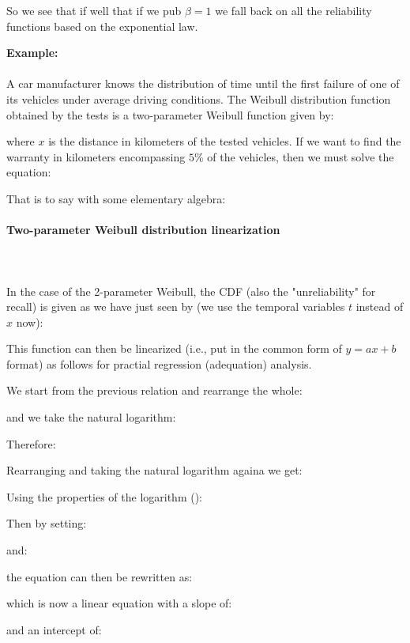	So we see that if well that if we pub $\beta=1$ we fall back on all the reliability functions based on the exponential law.
	\begin{tcolorbox}[colframe=black,colback=white,sharp corners]
	\textbf{{\Large {}}Example:}\\\\
	A car manufacturer knows the distribution of time until the first failure of one of its vehicles under average driving conditions. The Weibull distribution function obtained by the tests is a two-parameter Weibull function given by:
	
	where $x$ is the distance in kilometers of the tested vehicles.	
	If we want to find the warranty in kilometers encompassing $5\%$ of the vehicles, then we must solve the equation:
	
	That is to say with some elementary algebra:
	
	\end{tcolorbox}
	
	\paragraph{Two-parameter Weibull distribution linearization}\mbox{}\\\\
	In the case of the 2-parameter Weibull, the CDF (also the "unreliability" for recall) is given as we have just seen by (we use the temporal variables $t$ instead of $x$ now):
	
 	This function can then be linearized (i.e., put in the common form of $y=ax+b$ format) as follows for practial regression (adequation) analysis.
 	
 	We start from the previous relation and rearrange the whole:
	
 	and we take the natural logarithm:
	
 	Therefore:
	
	Rearranging and taking the natural logarithm againa we get:
	
	Using the properties of the logarithm ():
	
	Then by setting:
	
	and:
	
	the equation can then be rewritten as:
 	
	which is now a linear equation with a slope of:
	
	and an intercept of:
	
